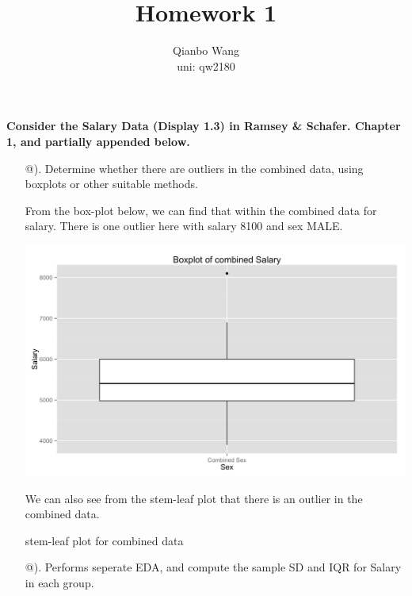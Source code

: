 \documentclass[10pt,letterpaper]{article}
\title{\textbf {Homework 1}}
\author{{Qianbo Wang}\\{uni: qw2180}}
\date{}
\makeatletter
\newcommand{\Rmnum}[1]{\expandafter\@slowromancap\romannumeral #1@}
\makeatother
\begin{document}
\maketitle
\thispagestyle{fancy}
\vspace{-2em}
\textbf{Consider the Salary Data (Display 1.3) in Ramsey \& Schafer. Chapter 1, and partially appended below.}
\begin{enumerate}[leftmargin=0cm,itemindent=.5cm,labelwidth=\itemindent,labelsep=0cm,align=left]
\item[\Rmnum{1}). ] Determine whether there are outliers in the combined data, using boxplots or other suitable methods.

From the box-plot below, we can find that within the combined data for salary. There is one outlier here with salary 8100 and sex MALE.
\begin{center}
\includegraphics[scale=0.13]{boxcombined}
\end{center}

We can also see from the stem-leaf plot that there is an outlier in the combined data. 
\begin{center}
stem-leaf plot for combined data

\end{center}

\item[\Rmnum{2}). ] Performs seperate EDA, and compute the sample SD and IQR for Salary in each group.


\end{enumerate}
\end{document}
